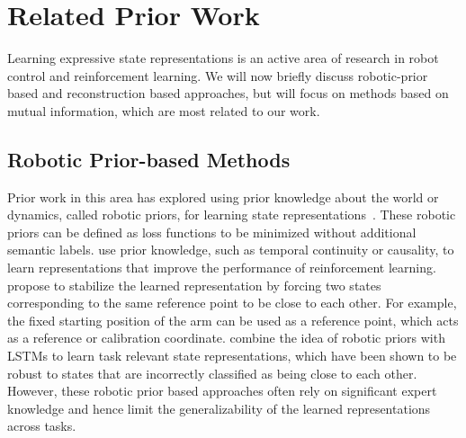 \documentclass[a4paper,12pt]{article}
\begin{document}


\section{Related Prior Work}
\label{section:Prior work}
Learning expressive state representations is an active area of research in robot control and reinforcement learning. We will now briefly discuss robotic-prior based and reconstruction based approaches, but will focus on methods based on mutual information, which are most related to our work.

\subsection{Robotic Prior-based Methods}
Prior work in this area has explored using prior knowledge about the world or dynamics, called robotic priors, for learning state representations~\cite{jonschkowski2015learning,jonschkowski2017pves}.
These robotic priors can be defined as loss functions to be minimized without additional semantic labels. 
\citet{jonschkowski2015learning} use prior knowledge, such as temporal continuity or causality, to learn representations that improve the performance of reinforcement learning. \citet{lesort2019deep} propose to stabilize the learned representation by forcing two states corresponding to the same reference point to be close to each other. For example, the fixed starting position of the arm can be used as a reference point, which acts as a reference or calibration coordinate. \citet{morik2019state} combine the idea of robotic priors with LSTMs to learn task relevant state representations, which have been shown to be robust to states that are incorrectly classified as being close to each other. However, these robotic prior based approaches often rely on significant expert knowledge and hence limit the generalizability of the learned representations across tasks. 
\end{document}
